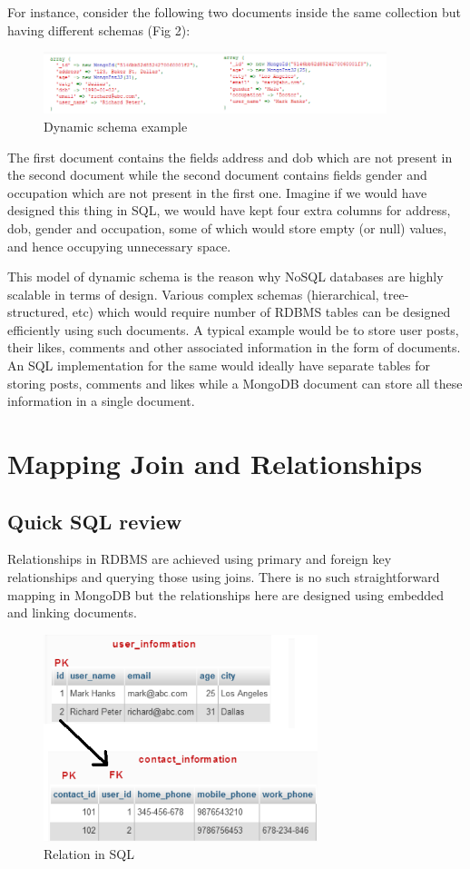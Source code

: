 \documentclass[conference]{IEEEtran}
\begin{document}
For instance, consider the following two documents inside the same collection but having different schemas (Fig 2):
\begin{figure}[H]
    \centering
    \includegraphics[width=10cm]{dynamicshema}
    \caption{Dynamic schema example~\cite{4}}
    \label{fig:fig4}
\end{figure}
The first document contains the fields address and dob which are not present in the second document while the second document contains fields gender and occupation which are not present in the first one. Imagine if we would have designed this thing in SQL, we would have kept four extra columns for address, dob, gender and occupation, some of which would store empty (or null) values, and hence occupying unnecessary space.

This model of dynamic schema is the reason why NoSQL databases are highly scalable in terms of design. Various complex schemas (hierarchical, tree-structured, etc) which would require number of RDBMS tables can be designed efficiently using such documents. A typical example would be to store user posts, their likes, comments and other associated information in the form of documents. An SQL implementation for the same would ideally have separate tables for storing posts, comments and likes while a MongoDB document can store all these information in a single document.
\section{Mapping Join and Relationships}
\subsection{Quick SQL review}
Relationships in RDBMS are achieved using primary and foreign key relationships and querying those using joins. There is no such straightforward mapping in MongoDB but the relationships here are designed using embedded and linking documents.
\begin{figure}[H]
    \centering
    \includegraphics[width=8cm]{pfkf}
    \caption{Relation in SQL}
    \label{fig:fig4}
\end{figure}
\end{document}
